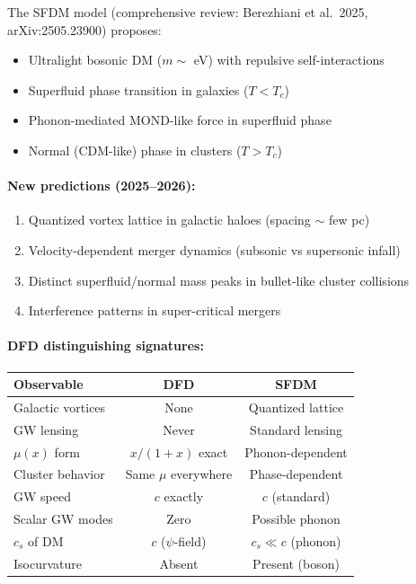 \documentclass[11pt]{article}
\begin{document}
The SFDM model (comprehensive review: Berezhiani et al.\ 2025,
arXiv:2505.23900) proposes:
\begin{itemize}
\item Ultralight bosonic DM ($m \sim$ eV) with repulsive
  self-interactions
\item Superfluid phase transition in galaxies ($T < T_c$)
\item Phonon-mediated MOND-like force in superfluid phase
\item Normal (CDM-like) phase in clusters ($T > T_c$)
\end{itemize}

\paragraph{New predictions (2025--2026):}
\begin{enumerate}
\item Quantized vortex lattice in galactic haloes (spacing
  $\sim$ few pc)
\item Velocity-dependent merger dynamics (subsonic vs supersonic
  infall)
\item Distinct superfluid/normal mass peaks in bullet-like
  cluster collisions
\item Interference patterns in super-critical mergers
\end{enumerate}

\paragraph{DFD distinguishing signatures:}
\begin{center}
\begin{tabular}{lcc}
\toprule
\textbf{Observable} & \textbf{DFD} & \textbf{SFDM} \\
\midrule
Galactic vortices & None & Quantized lattice \\
GW lensing & Never & Standard lensing \\
$\mu(x)$ form & $x/(1+x)$ exact & Phonon-dependent \\
Cluster behavior & Same $\mu$ everywhere & Phase-dependent \\
GW speed & $c$ exactly & $c$ (standard) \\
Scalar GW modes & Zero & Possible phonon \\
$c_s$ of DM & $c$ ($\psi$-field) & $c_s \ll c$ (phonon) \\
Isocurvature & Absent & Present (boson) \\
\bottomrule
\end{tabular}
\end{center}
\end{document}
